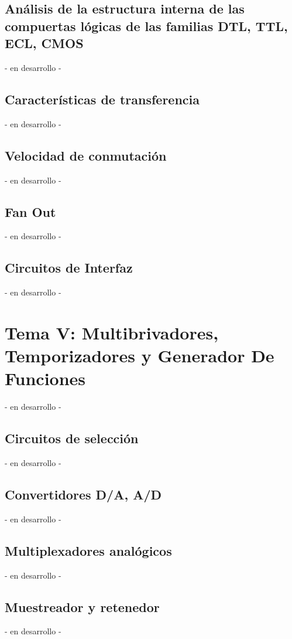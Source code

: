 \documentclass[landscape,twocolumn,letter]{book}
\begin{document}
		\subsection{Análisis de la estructura interna de las compuertas lógicas de las familias DTL, TTL, ECL, CMOS}
		- en desarrollo -
		
		\subsection{Características de transferencia}
		- en desarrollo -
		
		\subsection{Velocidad de conmutación}
		- en desarrollo -
		
		\subsection{Fan Out}
		- en desarrollo -
		
		\subsection{Circuitos de Interfaz}
		- en desarrollo -

	\section{Tema V: Multibrivadores, Temporizadores y Generador De Funciones}
		- en desarrollo -
		\subsection{Circuitos de selección}
		- en desarrollo -
		
		\subsection{Convertidores D/A, A/D}
		- en desarrollo -
		
		\subsection{Multiplexadores analógicos}
		- en desarrollo -
		
		\subsection{Muestreador y retenedor}
		- en desarrollo -
		
\end{document}
